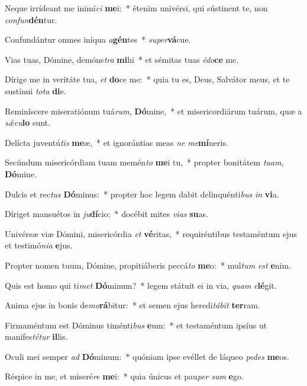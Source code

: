 \item Neque irrídeant me inimí\textit{ci} \textbf{me}i:~* étenim univérsi, qui sústinent te, non \textit{con}\textit{fun}\textbf{dén}tur.
\item Confundántur omnes iníqua \textit{a}\textbf{gén}tes~* \textit{su}\textit{per}\textbf{vá}cue.
\item Vias tuas, Dómine, demóns\textit{tra} \textbf{mi}hi~* et sémitas tuas \textit{é}\textit{do}\textbf{ce} me.
\item Dírige me in veritáte tua, \textit{et} \textbf{do}ce me:~* quia tu es, Deus, Salvátor meus, et te sustínui \textit{to}\textit{ta} \textbf{di}e.
\item Reminíscere miseratiónum tuá\textit{rum}, \textbf{Dó}mine,~* et misericordiárum tuárum, quæ a \textit{sǽ}\textit{cu}\textbf{lo} sunt.
\item Delícta juventú\textit{tis} \textbf{me}æ,~* et ignorántias meas \textit{ne} \textit{me}\textbf{mí}neris.
\item Secúndum misericórdiam tuam memén\textit{to} \textbf{me}i tu,~* propter bonitátem \textit{tu}\textit{am}, \textbf{Dó}mine.
\item Dulcis et rec\textit{tus} \textbf{Dó}minus:~* propter hoc legem dabit delinquénti\textit{bus} \textit{in} \textbf{vi}a.
\item Díriget mansuétos in \textit{ju}\textbf{dí}cio:~* docébit mites \textit{vi}\textit{as} \textbf{su}as.
\item Univérsæ viæ Dómini, misericórdia \textit{et} \textbf{vé}ritas,~* requiréntibus testaméntum ejus et testimó\textit{ni}\textit{a} \textbf{e}jus.
\item Propter nomen tuum, Dómine, propitiáberis peccá\textit{to} \textbf{me}o:~* mul\textit{tum} \textit{est} \textbf{e}nim.
\item Quis est homo qui ti\textit{met} \textbf{Dó}minum?~* legem státuit ei in via, \textit{quam} \textit{e}\textbf{lé}git.
\item Anima ejus in bonis de\textit{mo}\textbf{rá}bitur:~* et semen ejus heredi\textit{tá}\textit{bit} \textbf{ter}ram.
\item Firmaméntum est Dóminus timénti\textit{bus} \textbf{e}um:~* et testaméntum ipsíus ut manifes\textit{té}\textit{tur} \textbf{il}lis.
\item Oculi mei semper \textit{ad} \textbf{Dó}minum:~* quóniam ipse evéllet de láqueo \textit{pe}\textit{des} \textbf{me}os.
\item Réspice in me, et miseré\textit{re} \textbf{me}i:~* quia únicus et pau\textit{per} \textit{sum} \textbf{e}go.

